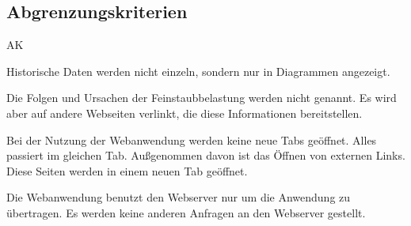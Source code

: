 \subsection{Abgrenzungskriterien}
\setcounter{counter}{10}
\begin{Kriterien}{AK}

	\item Historische Daten werden nicht einzeln, sondern nur in Diagrammen angezeigt.
	
	\item Die Folgen und Ursachen der Feinstaubbelastung werden nicht genannt. Es wird aber auf andere Webseiten verlinkt, die diese
	Informationen bereitstellen.
	
	\item Bei der Nutzung der \gls{Webanwendung} werden keine neue Tabs geöffnet. Alles passiert im gleichen Tab. Außgenommen 
	davon ist das Öffnen von externen Links. Diese Seiten werden in einem neuen Tab geöffnet.
	
	\item Die \gls{Webanwendung} benutzt den \gls{Webserver} nur um die Anwendung zu übertragen. Es werden keine anderen Anfragen 
	an den \gls{Webserver} gestellt.
	
\end{Kriterien}
